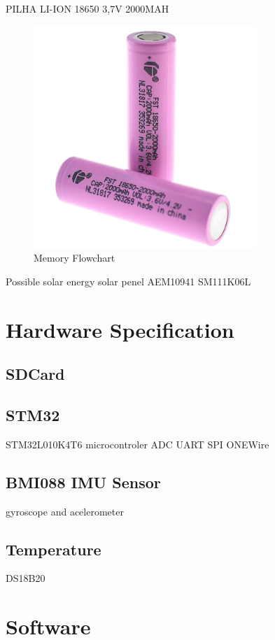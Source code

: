 PILHA LI-ION 18650 3,7V 2000MAH

\begin{figure}[H]
    \centering
    \includegraphics[width=0.75\textwidth]{images/chapter/design/components/batt.jpg}  %
    \caption{Memory Flowchart}
    \label{fig:Memory Flowchart}        
\end{figure}

Possible solar energy
solar penel
AEM10941
SM111K06L

\section{Hardware Specification}
\subsection{SDCard}
\subsection{STM32}

STM32L010K4T6
microcontroler
ADC
UART
SPI
ONEWire
\subsection{BMI088 IMU Sensor}
gyroscope and acelerometer


\subsection{Temperature}
DS18B20
\section{Software}

